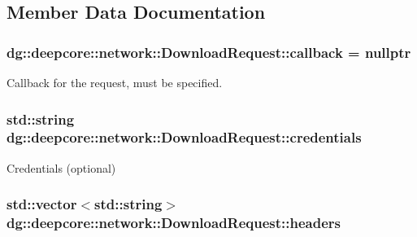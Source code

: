 \subsection{Member Data Documentation}
\subsubsection[{\texorpdfstring{callback}{callback}}]{ dg\+::deepcore\+::network\+::\+Download\+Request\+::callback = nullptr}\hypertarget{structdg_1_1deepcore_1_1network_1_1_download_request_adb453a945c53898c25e110d81c0d2369}{}\label{structdg_1_1deepcore_1_1network_1_1_download_request_adb453a945c53898c25e110d81c0d2369}


Callback for the request, must be specified. 

\subsubsection[{\texorpdfstring{credentials}{credentials}}]{\setlength{\rightskip}{0pt plus 5cm}std\+::string dg\+::deepcore\+::network\+::\+Download\+Request\+::credentials}\hypertarget{structdg_1_1deepcore_1_1network_1_1_download_request_a658bf11041a4e59708e11a03586a3cc8}{}\label{structdg_1_1deepcore_1_1network_1_1_download_request_a658bf11041a4e59708e11a03586a3cc8}


Credentials (optional) 

\subsubsection[{\texorpdfstring{headers}{headers}}]{\setlength{\rightskip}{0pt plus 5cm}std\+::vector$<$std\+::string$>$ dg\+::deepcore\+::network\+::\+Download\+Request\+::headers}\hypertarget{structdg_1_1deepcore_1_1network_1_1_download_request_a155aa5c32169a6bf6d47fec321672f4e}{}\label{structdg_1_1deepcore_1_1network_1_1_download_request_a155aa5c32169a6bf6d47fec321672f4e}


